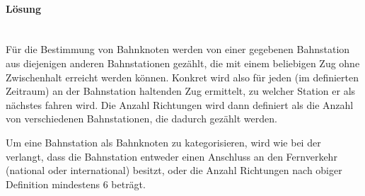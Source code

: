 \paragraph{Lösung}~\\
Für die Bestimmung von Bahnknoten werden von einer gegebenen Bahnstation aus diejenigen anderen Bahnstationen gezählt, die mit einem beliebigen Zug ohne Zwischenhalt erreicht werden können.
Konkret wird also für jeden (im definierten Zeitraum) an der Bahnstation haltenden Zug ermittelt, zu welcher Station er als nächstes fahren wird.
Die Anzahl Richtungen wird dann definiert als die Anzahl von verschiedenen Bahnstationen, die dadurch gezählt werden.

Um eine Bahnstation als Bahnknoten zu kategorisieren, wird wie bei der  verlangt, dass die Bahnstation entweder einen Anschluss an den Fernverkehr (national oder international) besitzt, oder die Anzahl Richtungen nach obiger Definition mindestens 6 beträgt.